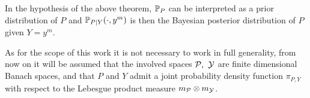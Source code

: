 In the hypothesis of the above theorem, $\mathbb P_P$ can be interpreted as a prior distribution of $P$ and $\mathbb P_{P \mid Y}(\cdot, y^m)$ is then the Bayesian posterior distribution of $P$ given $Y=y^m$.

As for the scope of this work it is not necessary to work in full generality, from now on it will be assumed that the involved spaces $\mathcal P, \  \mathcal Y$ are finite dimensional Banach spaces, and that $P$ and $Y$ admit a joint probability density function $\pi_{P,Y}$ with respect to the Lebesgue product measure $m_\mathcal P \otimes m_\mathcal Y$.